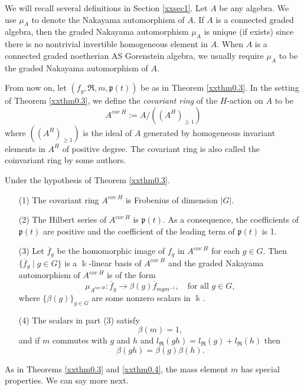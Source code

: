 We will recall several definitions in Section \ref{xxsec1}.
Let $A$ be any algebra. We use $\mu_A$ to denote the Nakayama 
automorphism of $A$. If $A$ is a connected graded algebra,
then the graded Nakayama automorphism $\mu_A$ is unique (if exists) since 
there is no nontrivial invertible homogeneous element in $A$. When 
$A$ is a connected graded noetherian AS Gorenstein algebra, we usually 
require $\mu_A$ to be the graded Nakayama automorphism of $A$. 

From now on, let $(f_g, \Re, m, {\mathfrak{p}}(t))$ be as in Theorem \ref{xxthm0.3}.
In the setting of Theorem \ref{xxthm0.3}, we define the {\it covariant ring} of the
$H$-action on $A$ to be 
$$A^{cov \; H}:=A/((A^H)_{\geq 1})$$
where $((A^H)_{\geq 1})$ is the ideal of $A$ generated by homogeneous
invariant elements in $A^H$ of positive degree. The covariant ring 
is also called the coinvariant ring by some authors. 

\begin{theorem}
\label{xxthm0.4} 
Under the hypothesis of Theorem {\rm{\ref{xxthm0.3}}}.
\begin{enumerate}
\item[(1)]
The covariant ring $A^{cov \; H}$ is Frobenius of 
dimension $|G|$. 
\item[(2)]
The Hilbert series of $A^{cov\; H}$ is ${\mathfrak{p}}(t)$. As a consequence,
the coefficients of ${\mathfrak{p}}(t)$ are positive and the coefficient of the
leading term of ${\mathfrak{p}}(t)$ is 1. 
\item[(3)]
Let $\overline{f}_g$ be the homomorphic image of $f_g$ in
$A^{cov\; H}$ for each $g\in G$. Then $\{\overline{f}_g \mid g\in G\}$
is a $\Bbbk$-linear basis of $A^{cov\; H}$ and the graded 
Nakayama automorphism of $A^{cov \; H}$ is of the form
$$\mu_{A^{cov\; H}}: \overline{f}_g\to \beta(g) \overline{f}_{mgm^{-1}}, 
\quad {\text{for all $g\in G$}},$$ 
where $\{\beta(g)\}_{g\in G}$ are some nonzero scalars in $\Bbbk$.
\item[(4)]
The scalars in part {\rm{(3)}} satisfy
$$\beta(m)=1,$$ and
if $m$ commutes with $g$ and $h$ and ${l_{\Re}}(gh)={l_{\Re}}(g)+{l_{\Re}}(h)$ then
$$\beta(gh)=\beta(g)\beta(h).$$
\end{enumerate}
\end{theorem}

As in Theorems \ref{xxthm0.3} and \ref{xxthm0.4}, the mass element $m$ 
has special properties. We can say more next.

